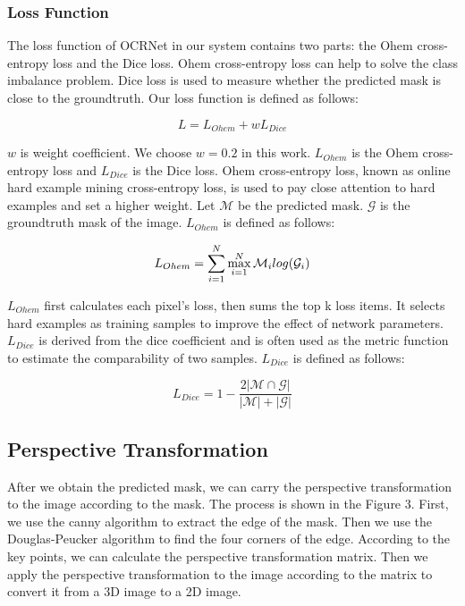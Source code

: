 \documentclass[10pt, conference, compsocconf]{IEEEtran}
\begin{document}
\subsubsection{Loss Function}

The loss function of OCRNet in our system contains two parts: the Ohem cross-entropy loss\cite{shrivastava2016training} and the Dice loss\cite{milletari2016v}.
Ohem cross-entropy loss can help to solve the class imbalance problem. Dice loss is used to measure whether the predicted mask is close to the groundtruth. Our loss function is defined as follows:

\begin{equation}
	L = L_{Ohem} + w L_{Dice}
\end{equation}

$w$ is weight coefficient. We choose $w = 0.2$ in this work. $L_{Ohem}$ is the Ohem cross-entropy loss and $L_{Dice}$ is the Dice loss. Ohem cross-entropy loss, known as online hard example mining cross-entropy loss, is used to pay close attention to hard examples and set a higher weight. Let $\mathcal{M}$ be the predicted mask. $\mathcal{G}$ is the groundtruth mask of the image. $L_{Ohem}$ is defined as follows:

\begin{equation}
	L_{Ohem} = \sum_{i=1}^{N} \max_{i=1}^{N} \mathcal{M}_i log(\mathcal{G}_i) \\
\end{equation}

$L_{Ohem}$ first calculates each pixel's loss, then sums the top k loss items. It selects hard examples as training samples to improve the effect of network parameters. $L_{Dice}$ is derived from the dice coefficient and is often used as the metric function to estimate the comparability of two samples.  $L_{Dice}$ is defined as follows:

\begin{equation}
	L_{Dice} = 1 - \frac{2|\mathcal{M} \cap \mathcal{G}|}{|\mathcal{M}| + |\mathcal{G}|}
\end{equation}


\subsection{Perspective Transformation}

After we obtain the predicted mask, we can carry the perspective transformation to the image according to the mask.
The process is shown in the Figure 3. First, we use the canny\cite{bao2005canny} algorithm to extract the edge of the mask. Then we use the Douglas-Peucker algorithm\cite{wu2004douglas} to find the four corners of the edge. According to the key points, we can calculate the perspective transformation matrix. Then we apply the perspective transformation to the image according to the matrix to convert it from a 3D image to a 2D image.
\end{document}
